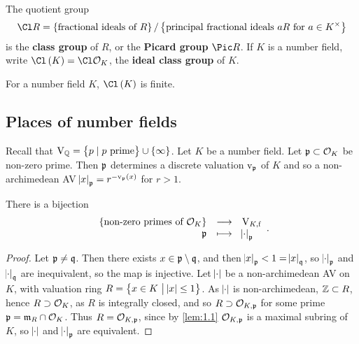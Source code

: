 The quotient group
$$ \Cl R = \cbr{\text{fractional ideals of} \ R} / \cbr{\text{principal fractional ideals} \ aR \ \text{for} \ a \in K^\times} $$
is the \textbf{class group} of $ R $, or the \textbf{Picard group} $ \Pic R $. If $ K $ is a number field, write $ \Cl\br{K} = \Cl \OOO_K $, the \textbf{ideal class group} of $ K $.

\begin{fact*}
For a number field $ K $, $ \Cl\br{K} $ is finite.
\end{fact*}

\pagebreak

\subsection{Places of number fields}

Recall that $ \V_\QQ = \cbr{p \mid p \ \text{prime}} \cup \cbr{\infty} $. Let $ K $ be a number field. Let $ \mathfrak{p} \subset \mathcal{O}_K $ be non-zero prime. Then $ \mathfrak{p} $ determines a discrete valuation $ \mathrm{v}_{\mathfrak{p}} $ of $ K $ and so a non-archimedean AV $ \abs{x}_\ppp = r^{-\v_\ppp\br{x}} $ for $ r > 1 $.

\begin{theorem}
There is a bijection
$$ \function{\cbr{\text{non-zero primes of} \ \OOO_K}}{\V_{K, \f}}{\ppp}{\abs{\cdot}_\ppp}. $$
\end{theorem}

\begin{proof}
Let $ \mathfrak{p} \ne \mathfrak{q} $. Then there exists $ x \in \mathfrak{p} \setminus \mathfrak{q} $, and then $ \abs{x}_{\mathfrak{p}} < 1 = \abs{x}_{\mathfrak{q}} $, so $ \abs{\cdot}_{\mathfrak{p}} $ and $ \abs{\cdot}_{\mathfrak{q}} $ are inequivalent, so the map is injective. Let $ \abs{\cdot} $ be a non-archimedean AV on $ K $, with valuation ring $ R = \cbr{x \in K \st \abs{x} \le 1} $. As $ \abs{\cdot} $ is non-archimedean, $ \mathbb{Z} \subset R $, hence $ R \supset \mathcal{O}_K $, as $ R $ is integrally closed, and so $ R \supset \mathcal{O}_{K, \mathfrak{p}} $ for some prime $ \mathfrak{p} = \mathfrak{m}_R \cap \mathcal{O}_K $. Thus $ R = \mathcal{O}_{K, \mathfrak{p}} $, since by \ref{lem:1.1} $ \mathcal{O}_{K, \mathfrak{p}} $ is a maximal subring of $ K $, so $ \abs{\cdot} $ and $ \abs{\cdot}_{\mathfrak{p}} $ are equivalent.
\end{proof}

